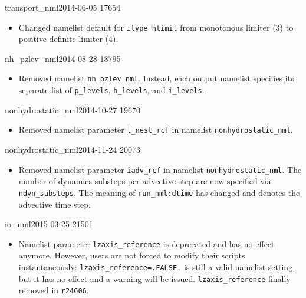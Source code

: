 \begin{changeitem}{transport\_nml}{2014-06-05 }{17654}
  \begin{itemize}
   \item Changed namelist default for \texttt{itype\_hlimit} from monotonous limiter (3) to positive definite limiter (4).
  \end{itemize}
\end{changeitem}

\begin{changeitem}{nh\_pzlev\_nml}{2014-08-28 }{18795}
  \begin{itemize}
   \item Removed namelist \texttt{nh\_pzlev\_nml}.
         Instead, each output namelist specifies its separate list of \texttt{p\_levels}, \texttt{h\_levels},
         and \texttt{i\_levels}.
  \end{itemize}
\end{changeitem}

\begin{changeitem}{nonhydrostatic\_nml}{2014-10-27 }{19670}
  \begin{itemize}
   \item Removed namelist parameter \texttt{l\_nest\_rcf} in namelist
         \texttt{nonhydrostatic\_nml}.
  \end{itemize}
\end{changeitem}

\begin{changeitem}{nonhydrostatic\_nml}{2014-11-24 }{20073}
  \begin{itemize}
   \item Removed namelist parameter \texttt{iadv\_rcf} in namelist
         \texttt{nonhydrostatic\_nml}. The number of dynamics substeps per advective step are now specified
         via \texttt{ndyn\_substeps}.
         The meaning of \texttt{run\_nml:dtime} has changed and denotes the advective time step.
  \end{itemize}
\end{changeitem}

\begin{changeitem}{io\_nml}{2015-03-25 }{21501}
  \begin{itemize}
   \item Namelist parameter \texttt{lzaxis\_reference} is deprecated and has no effect anymore.
         However, users are not forced to modify their scripts instantaneously: \texttt{lzaxis\_reference=.FALSE.}
         is still a valid namelist setting, but it has no effect and a warning will be issued.
         \texttt{lzaxis\_reference} finally removed in \texttt{r24606}.
  \end{itemize}
\end{changeitem}

